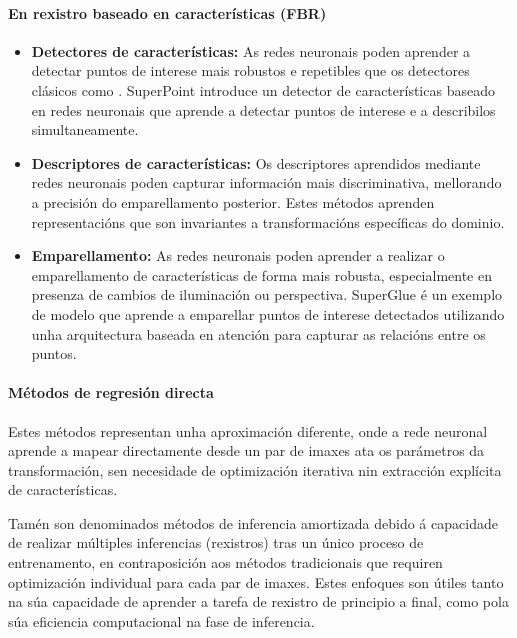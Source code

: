 \paragraph{En rexistro baseado en características (FBR)}
\label{par:FBR_substitution}

\begin{itemize}
\item \textbf{Detectores de características:} As redes neuronais poden aprender a detectar puntos de interese mais robustos e repetibles que os detectores clásicos como . SuperPoint \cite{superpoint} introduce un detector de características baseado en redes neuronais que aprende a detectar puntos de interese e a describilos simultaneamente.
\item \textbf{Descriptores de características:} Os descriptores aprendidos mediante redes neuronais poden capturar información mais discriminativa, mellorando a precisión do emparellamento posterior. Estes métodos aprenden representacións que son invariantes a transformacións específicas do dominio.
\item \textbf{Emparellamento:} As redes neuronais poden aprender a realizar o emparellamento de características de forma mais robusta, especialmente en presenza de cambios de iluminación ou perspectiva. SuperGlue \cite{superglue} é un exemplo de modelo que aprende a emparellar puntos de interese detectados utilizando unha arquitectura baseada en atención para capturar as relacións entre os puntos.
\end{itemize}

\paragraph{Métodos de regresión directa}
\label{par:direct_regression}
Estes métodos representan unha aproximación diferente, onde a rede neuronal aprende a mapear directamente desde un par de imaxes ata os parámetros da transformación, sen necesidade de optimización iterativa nin extracción explícita de características.

Tamén son denominados métodos de inferencia amortizada debido á capacidade de realizar múltiples inferencias (rexistros) tras un único proceso de entrenamento, en contraposición aos métodos tradicionais que requiren optimización individual para cada par de imaxes.
Estes enfoques son útiles tanto na súa capacidade de aprender a tarefa de rexistro de principio a final, como pola súa eficiencia computacional na fase de inferencia.



